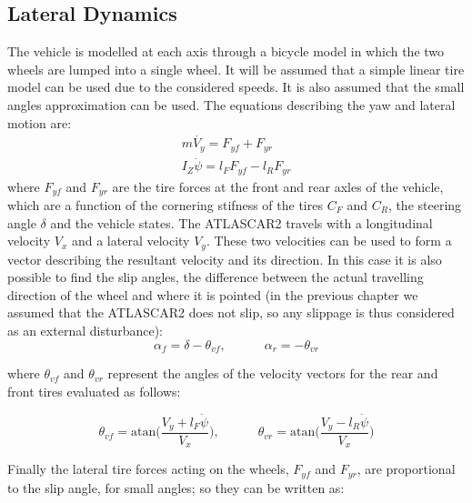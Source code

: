 \subsection{Lateral Dynamics}

The vehicle is modelled at each axis through a bicycle model in which the two wheels are lumped into a single wheel. It will be assumed that a simple linear tire model can be used due to the considered speeds. It is also assumed that the small angles approximation can be used.
The equations describing the yaw and lateral motion are:
\begin{equation}
	\label{eqn:yaw_lateral_motion}
	\begin{array}{ll}
	m\dot{V_y}=F_{yf}+F_{yr}\\
	I_Z\ddot{\psi}=l_FF_{yf}-l_RF_{yr}
	\end{array}
\end{equation}
where $F_{yf}$ and $F_{yr}$ are the tire forces at the front and rear axles of the vehicle, which are a function of the cornering stifness of the tires $C_F$ and $C_R$, the steering angle $\delta$ and the vehicle states.
The ATLASCAR2 travels with a longitudinal velocity $V_x$ and a lateral velocity $V_y$. These two velocities can be used to form a vector describing the resultant velocity and its direction. In this case it is also possible to find the slip angles, the difference between the actual travelling direction of the wheel and where it is pointed \cite{Nilsson2015} (in the previous chapter we assumed that the ATLASCAR2 does not slip, so any slippage is thus considered as an external disturbance):
\begin{equation}
	\label{eqn:alphas}
	\alpha_f = \delta-\theta_{vf},\qquad\quad
	\alpha_r = -\theta_{vr}
\end{equation}

where $\theta_{vf}$ and $\theta_{vr}$ represent the angles of the velocity vectors for the rear and front tires evaluated as follows:

\begin{equation}
\label{eqn:theta_v}
\theta_{vf}=\text{atan}\Bigg(\frac{V_y+l_F\dot{\psi}}{V_x}\Bigg),
\qquad \quad
\theta_{vr}=\text{atan}\Bigg(\frac{V_y-l_R\dot{\psi}}{V_x}\Bigg)
\end{equation}

Finally the lateral tire forces acting on the wheels, $F_{yf}$ and $F_{yr}$, are proportional to the slip angle, for small angles; so they can be written as:


